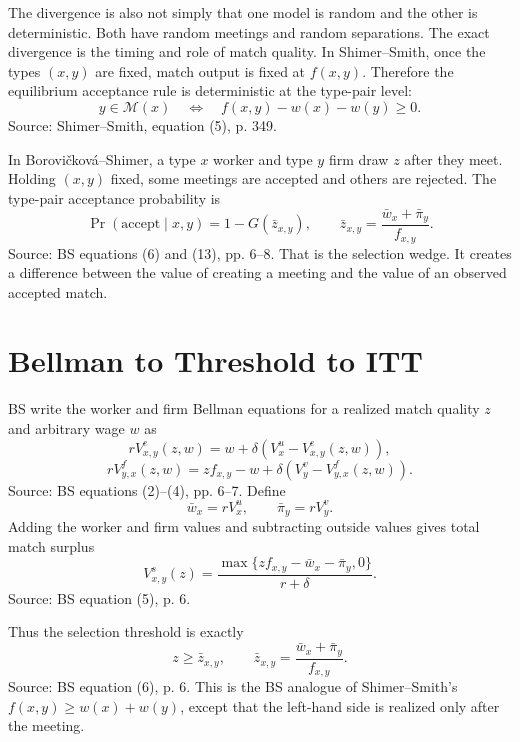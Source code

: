 \documentclass[11pt]{article}
\begin{document}
The divergence is also not simply that one model is random and the other is
deterministic. Both have random meetings and random separations. The exact
divergence is the timing and role of match quality. In Shimer--Smith, once the
types $(x,y)$ are fixed, match output is fixed at $f(x,y)$. Therefore the
equilibrium acceptance rule is deterministic at the type-pair level:
\[
y\in \mathcal M(x)
\quad\Longleftrightarrow\quad
f(x,y)-w(x)-w(y)\geq 0 .
\]
Source: Shimer--Smith, equation (5), p. 349.

In Borovi\v{c}kov\'a--Shimer, a type $x$ worker and type $y$ firm draw $z$ after
they meet. Holding $(x,y)$ fixed, some meetings are accepted and others are
rejected. The type-pair acceptance probability is
\[
\Pr(\text{accept}\mid x,y)=1-G(\bar z_{x,y}),
\qquad
\bar z_{x,y}=\frac{\bar w_x+\bar\pi_y}{f_{x,y}}.
\]
Source: BS equations (6) and (13), pp. 6--8. That is the selection wedge. It
creates a difference between the value of creating a meeting and the value of an
observed accepted match.

\section{Bellman to Threshold to ITT}

BS write the worker and firm Bellman equations for a realized match quality
$z$ and arbitrary wage $w$ as
\[
rV^e_{x,y}(z,w)=w+\delta\left(V_x^u-V^e_{x,y}(z,w)\right),
\]
\[
rV^f_{y,x}(z,w)=z f_{x,y}-w+\delta\left(V_y^v-V^f_{y,x}(z,w)\right).
\]
Source: BS equations (2)--(4), pp. 6--7. Define
\[
\bar w_x=rV_x^u,\qquad \bar\pi_y=rV_y^v.
\]
Adding the worker and firm values and subtracting outside values gives total
match surplus
\[
V^s_{x,y}(z)
=
\frac{\max\{z f_{x,y}-\bar w_x-\bar\pi_y,0\}}{r+\delta}.
\]
Source: BS equation (5), p. 6.

Thus the selection threshold is exactly
\[
z\geq \bar z_{x,y},
\qquad
\bar z_{x,y}
=
\frac{\bar w_x+\bar\pi_y}{f_{x,y}}.
\]
Source: BS equation (6), p. 6. This is the BS analogue of Shimer--Smith's
$f(x,y)\geq w(x)+w(y)$, except that the left-hand side is realized only after
the meeting.
\end{document}
